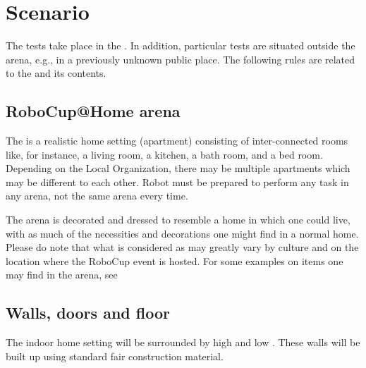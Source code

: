 \section{Scenario}
\label{sec:scenario}

The tests take place in the . In addition, particular tests are situated outside the arena, e.g., in a previously unknown public place. The following rules are related to the  and its contents. 

\subsection{RoboCup@Home arena}
The  is a realistic home setting (apartment) consisting of inter-connected rooms like, for instance, a living room, a kitchen, a bath room, and a bed room. 
Depending on the Local Organization, there may be multiple apartments which may be different to each other.
Robot must be prepared to perform any task in any arena, not the same arena every time. 

The arena is decorated and dressed to resemble a home in which one could live, with as much of the necessities and decorations one might find in a normal home. 
Please do note that what is considered as  may greatly vary by culture and on the location where the RoboCup event is hosted. 
For some examples on items one may find in the arena, see 



\subsection{Walls, doors and floor}
\label{rule:scenario_walls}

The indoor home setting will be surrounded by high and low . These walls will be built up using standard fair construction material.

